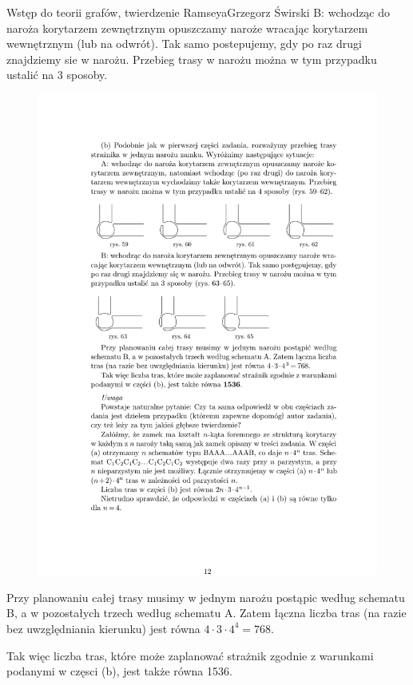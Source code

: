 \begin{referat}{Wstęp do teorii grafów, twierdzenie Ramseya}{Grzegorz Świrski}
B: wchodząc do naroża korytarzem zewnętrznym opuszczamy naroże wracając
korytarzem wewnętrznym (lub na odwrót). Tak samo postepujemy, gdy
po raz drugi znajdziemy sie w narożu. Przebieg trasy w narożu można w tym
przypadku ustalić na 3 sposoby.
\begin{figure}[!h]
  \begin{flushright}
  \includegraphics[scale=1]{./swirski/ex6f.pdf}
  \end{flushright}
\end{figure}

Przy planowaniu całej trasy musimy w jednym narożu postąpic według
schematu B, a w pozostałych trzech według schematu A. Zatem łączna liczba
tras (na razie bez uwzględniania kierunku) jest równa $4 \cdot 3 \cdot 4^4 = 768$.

Tak więc liczba tras, które może zaplanować strażnik zgodnie z warunkami
podanymi w częsci (b), jest także równa 1536.


\end{referat}
